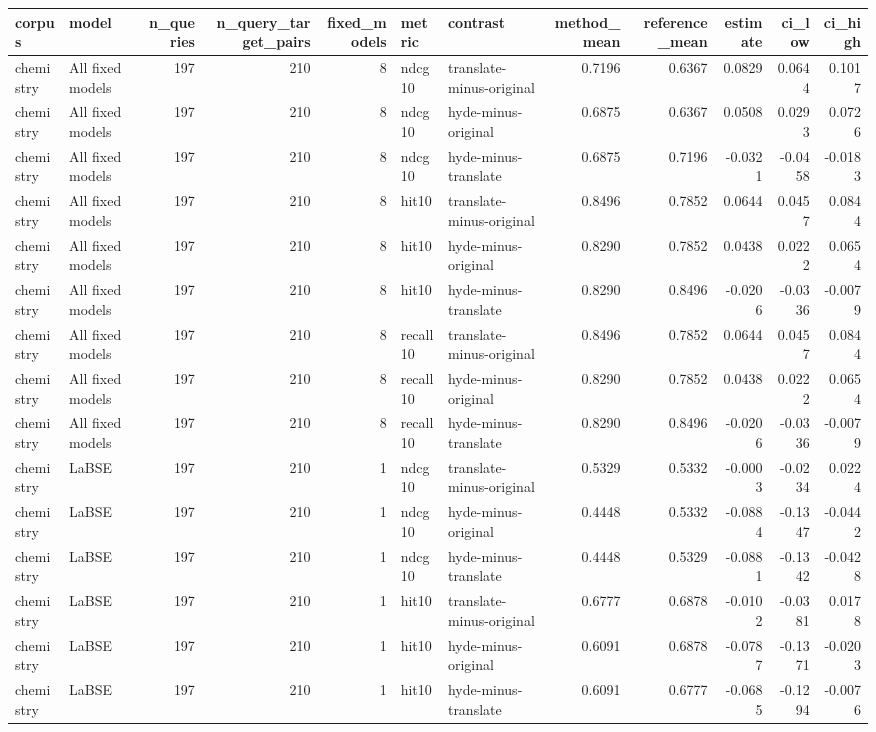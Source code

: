 \begin{tabular}{llrrrllrrrrr}
\toprule
corpus & model & n\_queries & n\_query\_target\_pairs & fixed\_models & metric & contrast & method\_mean & reference\_mean & estimate & ci\_low & ci\_high \\
\midrule
chemistry & All fixed models & 197 & 210 & 8 & ndcg10 & translate-minus-original & 0.7196 & 0.6367 & 0.0829 & 0.0644 & 0.1017 \\
chemistry & All fixed models & 197 & 210 & 8 & ndcg10 & hyde-minus-original & 0.6875 & 0.6367 & 0.0508 & 0.0293 & 0.0726 \\
chemistry & All fixed models & 197 & 210 & 8 & ndcg10 & hyde-minus-translate & 0.6875 & 0.7196 & -0.0321 & -0.0458 & -0.0183 \\
chemistry & All fixed models & 197 & 210 & 8 & hit10 & translate-minus-original & 0.8496 & 0.7852 & 0.0644 & 0.0457 & 0.0844 \\
chemistry & All fixed models & 197 & 210 & 8 & hit10 & hyde-minus-original & 0.8290 & 0.7852 & 0.0438 & 0.0222 & 0.0654 \\
chemistry & All fixed models & 197 & 210 & 8 & hit10 & hyde-minus-translate & 0.8290 & 0.8496 & -0.0206 & -0.0336 & -0.0079 \\
chemistry & All fixed models & 197 & 210 & 8 & recall10 & translate-minus-original & 0.8496 & 0.7852 & 0.0644 & 0.0457 & 0.0844 \\
chemistry & All fixed models & 197 & 210 & 8 & recall10 & hyde-minus-original & 0.8290 & 0.7852 & 0.0438 & 0.0222 & 0.0654 \\
chemistry & All fixed models & 197 & 210 & 8 & recall10 & hyde-minus-translate & 0.8290 & 0.8496 & -0.0206 & -0.0336 & -0.0079 \\
chemistry & LaBSE & 197 & 210 & 1 & ndcg10 & translate-minus-original & 0.5329 & 0.5332 & -0.0003 & -0.0234 & 0.0224 \\
chemistry & LaBSE & 197 & 210 & 1 & ndcg10 & hyde-minus-original & 0.4448 & 0.5332 & -0.0884 & -0.1347 & -0.0442 \\
chemistry & LaBSE & 197 & 210 & 1 & ndcg10 & hyde-minus-translate & 0.4448 & 0.5329 & -0.0881 & -0.1342 & -0.0428 \\
chemistry & LaBSE & 197 & 210 & 1 & hit10 & translate-minus-original & 0.6777 & 0.6878 & -0.0102 & -0.0381 & 0.0178 \\
chemistry & LaBSE & 197 & 210 & 1 & hit10 & hyde-minus-original & 0.6091 & 0.6878 & -0.0787 & -0.1371 & -0.0203 \\
chemistry & LaBSE & 197 & 210 & 1 & hit10 & hyde-minus-translate & 0.6091 & 0.6777 & -0.0685 & -0.1294 & -0.0076 \\

\end{tabular}
